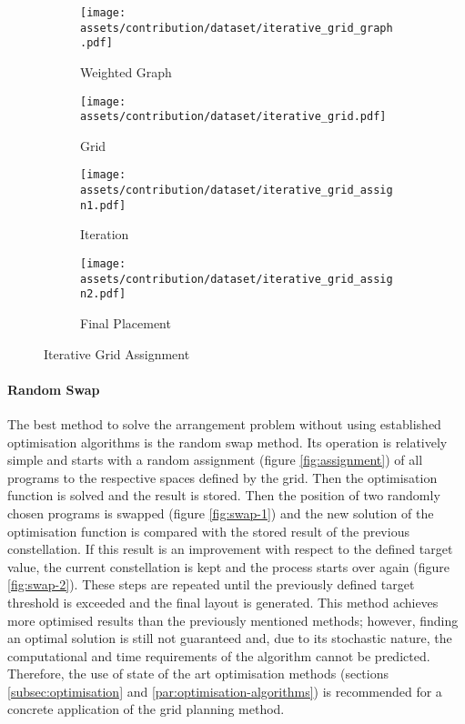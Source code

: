 \documentclass[a4paper, 12pt]{report}
\begin{document}
\begin{figure}
\centering
\begin{subfigure}{.25\textwidth}
\centering
\texttt{[image: assets/contribution/dataset/iterative\_grid\_graph.pdf]}
\caption{Weighted Graph}
\label{fig:weighted-graph-2}
\end{subfigure}%
\begin{subfigure}{.25\textwidth}
\centering
\texttt{[image: assets/contribution/dataset/iterative\_grid.pdf]}
\caption{Grid}
\label{fig:grid-2}
\end{subfigure}%
\begin{subfigure}{.25\textwidth}
\centering
\texttt{[image: assets/contribution/dataset/iterative\_grid\_assign1.pdf]}
\caption{Iteration}
\label{fig:iteration-8}
\end{subfigure}%
\begin{subfigure}{.25\textwidth}
\centering
\texttt{[image: assets/contribution/dataset/iterative\_grid\_assign2.pdf]}
\caption{Final Placement}
\label{fig:final-placement-2}
\end{subfigure}
\caption{Iterative Grid Assignment}
\label{fig:iterative-grid-assignment}
\end{figure}

\paragraph{Random Swap}\label{par:random-swap}

The best method to solve the arrangement problem without using established optimisation algorithms is the random swap method. Its operation is relatively simple and starts with a random assignment (figure \ref{fig:assignment}) of all programs to the respective spaces defined by the grid. Then the optimisation function is solved and the result is stored. Then the position of two randomly chosen programs is swapped (figure \ref{fig:swap-1}) and the new solution of the optimisation function is compared with the stored result of the previous constellation. If this result is an improvement with respect to the defined target value, the current constellation is kept and the process starts over again (figure \ref{fig:swap-2}). These steps are repeated until the previously defined target threshold is exceeded and the final layout is generated. This method achieves more optimised results than the previously mentioned methods; however, finding an optimal solution is still not guaranteed and, due to its \gls{stochastic} nature, the computational and time requirements of the algorithm cannot be predicted. Therefore, the use of state of the art optimisation methods (sections \ref{subsec:optimisation} and \ref{par:optimisation-algorithms}) is recommended for a concrete application of the grid planning method.
\end{document}
